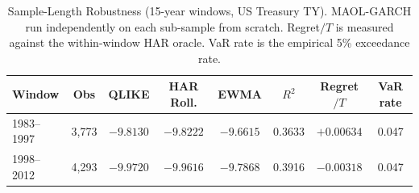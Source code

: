 \begin{table}[H]
\centering
\caption{Sample-Length Robustness (15-year windows, US Treasury TY). MAOL-GARCH run independently on each sub-sample from scratch. Regret$/T$ is measured against the within-window HAR oracle. VaR rate is the empirical 5\% exceedance rate.}
\label{tab:sl_15y}
\small
\begin{tabular}{lccccccc}
\toprule
Window & Obs & QLIKE & HAR Roll. & EWMA & $R^2$ & Regret$/T$ & VaR rate \\
\midrule
1983--1997 & 3,773 & $-9.8130$ & $-9.8222$ & $-9.6615$ & 0.3633 & $+0.00634$ & 0.047 \\
1998--2012 & 4,293 & $-9.9720$ & $-9.9616$ & $-9.7868$ & 0.3916 & $-0.00318$ & 0.047 \\
\bottomrule
\end{tabular}
\end{table}

